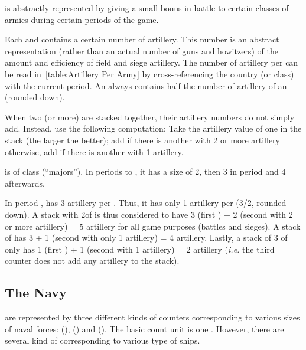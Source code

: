 \aparag[Cavalry] is abstractly represented by giving a small bonus in battle
to certain classes of armies during certain periods of the game.

\aparag[Artillery.] Each \ARMY\facemoins and \ARMY\faceplus contains a certain
number of artillery. This number is an abstract representation (rather than an
actual number of guns and howitzers) of the amount and efficiency of field and
siege artillery.
\bparag The number of artillery per \ARMY\faceplus can be read
in~\ref{table:Artillery Per Army} by cross-referencing the country (or class)
with the current period.
\bparag An \ARMY\facemoins always contains half the number of artillery of an
\ARMY\faceplus (rounded down).


 When two (or more) \ARMY are stacked together,
their artillery numbers do not simply add. Instead, use the following
computation:
\bparag Take the artillery value of one \ARMY in the stack (the larger the
better); add  if there is another \ARMY with 2 or more artillery
otherwise, add  if there is another \ARMY with 1 artillery.

\begin{exemple}
  \FRA is of class \CAIV (``majors''). In periods  to ,
  it has a size of 2, then 3 in period  and 4 afterwards.

  In period , \FRA has 3 artillery per \ARMY\faceplus. Thus, it has
  only 1 artillery per \ARMY\facemoins (3/2, rounded down). A stack with
  2\ARMY\faceplus of \FRA is thus considered to have 3 (first \ARMY) + 2
  (second \ARMY with 2 or more artillery) = 5 artillery for all game purposes
  (battles and sieges). A stack of \ARMY\faceplus \ARMY\facemoins has 3 + 1
  (second \ARMY with only 1 artillery) = 4 artillery. Lastly, a stack of 3
  \ARMY\facemoins of \FRA only has 1 (first \ARMY) + 1 (second \ARMY with 1
  artillery) = 2 artillery (\emph{i.e.} the third \ARMY counter does not add
  any artillery to the stack).
\end{exemple}



\subsection{The Navy}

 are represented by three different kinds of counters
corresponding to various sizes of naval forces:  (\FLEET),
 (\ND) and 
(\NDE).
\bparag The basic count unit is one \ND. However, there are several kind of
\ND corresponding to various type of ships.

